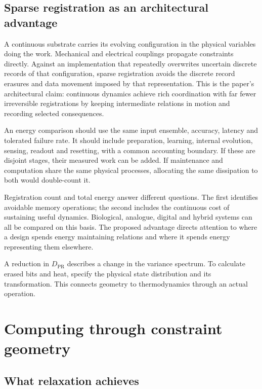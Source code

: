 \documentclass[11pt,a4paper]{article}
\begin{document}
\subsection{Sparse registration as an architectural advantage}

A continuous substrate carries its evolving configuration in the physical variables doing the work. Mechanical and electrical couplings propagate constraints directly. Against an implementation that repeatedly overwrites uncertain discrete records of that configuration, sparse registration avoids the discrete record erasures and data movement imposed by that representation. This is the paper's architectural claim: continuous dynamics achieve rich coordination with far fewer irreversible registrations by keeping intermediate relations in motion and recording selected consequences.

An energy comparison should use the same input ensemble, accuracy, latency and tolerated failure rate. It should include preparation, learning, internal evolution, sensing, readout and resetting, with a common accounting boundary. If these are disjoint stages, their measured work can be added. If maintenance and computation share the same physical processes, allocating the same dissipation to both would double-count it.

Registration count and total energy answer different questions. The first identifies avoidable memory operations; the second includes the continuous cost of sustaining useful dynamics. Biological, analogue, digital and hybrid systems can all be compared on this basis. The proposed advantage directs attention to where a design spends energy maintaining relations and where it spends energy representing them elsewhere.

A reduction in \(D_{\mathrm{PR}}\) describes a change in the variance spectrum. To calculate erased bits and heat, specify the physical state distribution and its transformation. This connects geometry to thermodynamics through an actual operation.

\section{Computing through constraint geometry}
\label{sec:computation}

\subsection{What relaxation achieves}
\end{document}
